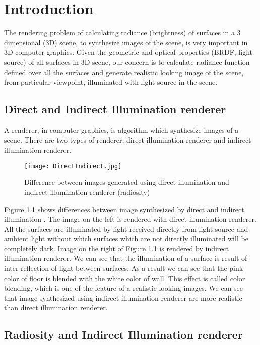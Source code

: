 \chapter{\label{Intro}Introduction}

The rendering problem of calculating radiance  (brightness) of surfaces in a 3 dimensional (3D) scene, to synthesize images of the scene, is very important in 3D computer graphics. Given the geometric and optical properties (BRDF, light source) of all surfaces in 3D scene, our concern is to calculate radiance function defined over all the surfaces and generate realistic looking image of the scene, from particular viewpoint, illuminated with light source in the scene.

\section{Direct and Indirect Illumination renderer}
A renderer, in computer graphics, is algorithm which synthesize images of a scene. There are two types of renderer, direct illumination renderer and indirect illumination renderer. 
\begin{figure}[tbh]
\centering{}
\captionsetup{justification=centering}
\texttt{[image: DirectIndirect.jpg]}
\caption{\label{fig:directindirect}Difference between images generated using direct illumination and indirect illumination renderer (radiosity)\\ \cite{wikiradiosity}}
\end{figure}
Figure \ref{fig:directindirect} shows differences between image synthesized by direct and indirect illumination . The image on the left is rendered with direct illumination renderer. All the surfaces are illuminated by light received directly from light source and ambient light without which surfaces which are not directly illuminated will be completely dark. Image on the right of Figure \ref{fig:directindirect} is rendered by indirect illumination renderer. We can see that the illumination of a surface is result of inter-reflection of light between surfaces. As a result we can see that the pink color of floor is blended with the white color of wall. This effect is called color blending, which is one of the feature of a realistic looking images.  We can see that image synthesized using indirect illumination renderer are more realistic than direct illumination renderer.

\section{Radiosity and Indirect Illumination renderer }

